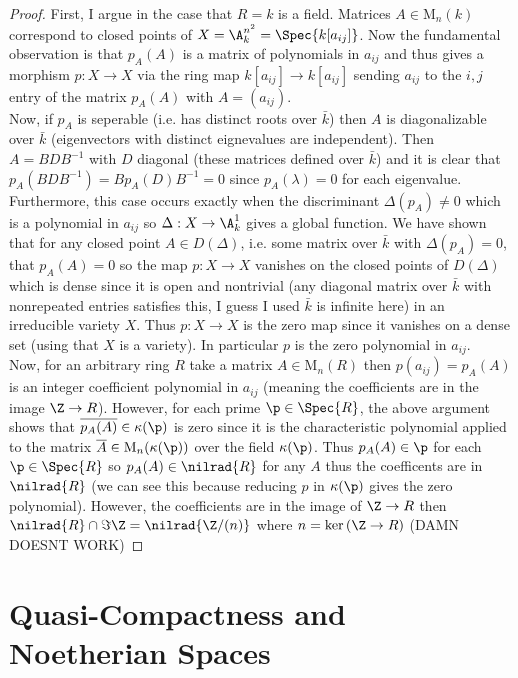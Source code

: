 \documentclass[12pt]{article}
\begin{document}
\begin{proof}
First, I argue in the case that $R = k$ is a field.
Matrices $A \in \mathrm{M}_n(k)$ correspond to closed points of $X = \A^{n^2}_k = \Spec{k[a_{ij}]}$. Now the fundamental observation is that $p_A(A)$ is a matrix of polynomials in $a_{ij}$ and thus gives a morphism $p : X \to X$ via the ring map $k[a_{ij}] \to k[a_{ij}]$ sending $a_{ij}$ to the $i,j$ entry of the matrix $p_A(A)$ with $A = (a_{ij})$. 
\bigskip\\
Now, if $p_A$ is seperable (i.e. has distinct roots over $\bar{k}$) then $A$ is diagonalizable over $\bar{k}$ (eigenvectors with distinct eignevalues are independent). Then $A = B D B^{-1}$ with $D$ diagonal (these matrices defined over $\bar{k}$) and it is clear that $p_A(B D B^{-1}) = B p_A(D) B^{-1} = 0$ since $p_A(\lambda) = 0$ for each eigenvalue. Furthermore, this case occurs exactly when the discriminant $\Delta(p_A) \neq 0$ which is a polynomial in $a_{ij}$ so $\Delta : X \to \A^1_k$ gives a global function. We have shown that for any closed point $A \in D(\Delta)$, i.e. some matrix over $\bar{k}$ with $\Delta(p_A) = 0$, that  $p_A(A) = 0$ so the map $p : X \to X$ vanishes on the closed points of $D(\Delta)$ which is dense since it is open and nontrivial (any diagonal matrix over $\bar{k}$ with nonrepeated entries satisfies this, I guess I used $\bar{k}$ is infinite here) in an irreducible variety $X$. Thus $p : X \to X$ is the zero map since it vanishes on a dense set (using that $X$ is a variety). In particular $p$ is the zero polynomial in $a_{ij}$.
\bigskip\\
Now, for an arbitrary ring $R$ take a matrix $A \in \mathrm{M}_n(R)$ then $p(a_{ij}) = p_A(A)$ is an integer coefficient polynomial in $a_{ij}$ (meaning the coefficients are in the image $\Z \to R$). However, for each prime $\p \in \Spec{R}$, the above argument shows that $\overline{p_A(A)} \in \kappa(\p)$ is zero since it is the characteristic polynomial applied to the matrix $\overline{A} \in \mathrm{M}_n(\kappa(\p))$ over the field $\kappa(\p)$. Thus $p_A(A) \in \p$ for each $\p \in \Spec{R}$ so $p_A(A) \in \nilrad{R}$ for any $A$ thus the coefficents are in $\nilrad{R}$ (we can see this because reducing $p$ in $\kappa(\p)$ gives the zero polynomial). However, the coefficients are in the image of $\Z \to R$ then $\nilrad{R} \cap \Im{\Z} = \nilrad{\Z / (n)}$ where $n = \ker{(\Z \to R)}$ 
(DAMN DOESNT WORK)
\end{proof}


\section{Quasi-Compactness and Noetherian Spaces}
\end{document}

